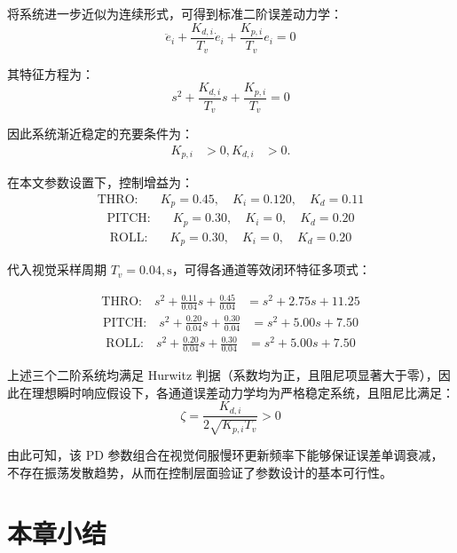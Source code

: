将系统进一步近似为连续形式，可得到标准二阶误差动力学：
\begin{equation}
\ddot e_i + \frac{K_{d,i}}{T_v}\dot e_i + \frac{K_{p,i}}{T_v} e_i = 0
\end{equation}

其特征方程为：
\begin{equation}
s^2 + \frac{K_{d,i}}{T_v}s + \frac{K_{p,i}}{T_v} = 0
\end{equation}

因此系统渐近稳定的充要条件为：
\begin{align}
K_{p,i} &> 0, K_{d,i} &> 0.
\end{align}

在本文参数设置下，控制增益为：
\begin{align}
\text{THRO:}\quad &K_p = 0.45,\quad K_i = 0.120,\quad K_d = 0.11
\end{align}
\begin{align}
\text{PITCH:}\quad &K_p = 0.30,\quad K_i = 0,\quad K_d = 0.20
\end{align}
\begin{align}
\text{ROLL:}\quad &K_p = 0.30,\quad K_i = 0,\quad K_d = 0.20
\end{align}

代入视觉采样周期 $T_v = 0.04,\mathrm{s}$，可得各通道等效闭环特征多项式：

\begin{align}
\text{THRO:}\quad
s^2 + \frac{0.11}{0.04}s + \frac{0.45}{0.04}
&= s^2 + 2.75 s + 11.25
\end{align}
\begin{align}
\text{PITCH:}\quad
s^2 + \frac{0.20}{0.04}s + \frac{0.30}{0.04}
&= s^2 + 5.00 s + 7.50
\end{align}
\begin{align}
\text{ROLL:}\quad
s^2 + \frac{0.20}{0.04}s + \frac{0.30}{0.04}
&= s^2 + 5.00 s + 7.50
\end{align}

上述三个二阶系统均满足 Hurwitz 判据（系数均为正，且阻尼项显著大于零），因此在理想瞬时响应假设下，各通道误差动力学均为严格稳定系统，且阻尼比满足：
\begin{equation}
\zeta = \frac{K_{d,i}}{2\sqrt{K_{p,i}T_v}} > 0
\end{equation}

由此可知，该 PD 参数组合在视觉伺服慢环更新频率下能够保证误差单调衰减，不存在振荡发散趋势，从而在控制层面验证了参数设计的基本可行性。

\section{本章小结}

